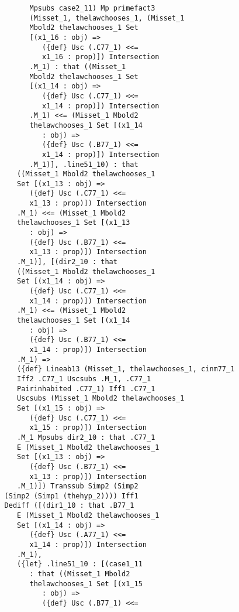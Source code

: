 \documentclass[12pt]{article}
\begin{document}
\begin{verbatim}
                Mpsubs case2_11) Mp primefact3 
                (Misset_1, thelawchooses_1, (Misset_1 
                Mbold2 thelawchooses_1 Set 
                [(x1_16 : obj) => 
                   ({def} Usc (.C77_1) <<= 
                   x1_16 : prop)]) Intersection 
                .M_1) : that ((Misset_1 
                Mbold2 thelawchooses_1 Set 
                [(x1_14 : obj) => 
                   ({def} Usc (.C77_1) <<= 
                   x1_14 : prop)]) Intersection 
                .M_1) <<= (Misset_1 Mbold2 
                thelawchooses_1 Set [(x1_14 
                   : obj) => 
                   ({def} Usc (.B77_1) <<= 
                   x1_14 : prop)]) Intersection 
                .M_1)], .line51_10) : that 
             ((Misset_1 Mbold2 thelawchooses_1 
             Set [(x1_13 : obj) => 
                ({def} Usc (.C77_1) <<= 
                x1_13 : prop)]) Intersection 
             .M_1) <<= (Misset_1 Mbold2 
             thelawchooses_1 Set [(x1_13 
                : obj) => 
                ({def} Usc (.B77_1) <<= 
                x1_13 : prop)]) Intersection 
             .M_1)], [(dir2_10 : that 
             ((Misset_1 Mbold2 thelawchooses_1 
             Set [(x1_14 : obj) => 
                ({def} Usc (.C77_1) <<= 
                x1_14 : prop)]) Intersection 
             .M_1) <<= (Misset_1 Mbold2 
             thelawchooses_1 Set [(x1_14 
                : obj) => 
                ({def} Usc (.B77_1) <<= 
                x1_14 : prop)]) Intersection 
             .M_1) => 
             ({def} Lineab13 (Misset_1, thelawchooses_1, cinm77_1 
             Iff2 .C77_1 Uscsubs .M_1, .C77_1 
             Pairinhabited .C77_1) Iff1 .C77_1 
             Uscsubs (Misset_1 Mbold2 thelawchooses_1 
             Set [(x1_15 : obj) => 
                ({def} Usc (.C77_1) <<= 
                x1_15 : prop)]) Intersection 
             .M_1 Mpsubs dir2_10 : that .C77_1 
             E (Misset_1 Mbold2 thelawchooses_1 
             Set [(x1_13 : obj) => 
                ({def} Usc (.B77_1) <<= 
                x1_13 : prop)]) Intersection 
             .M_1)]) Transsub Simp2 (Simp2 
          (Simp2 (Simp1 (thehyp_2)))) Iff1 
          Dediff ([(dir1_10 : that .B77_1 
             E (Misset_1 Mbold2 thelawchooses_1 
             Set [(x1_14 : obj) => 
                ({def} Usc (.A77_1) <<= 
                x1_14 : prop)]) Intersection 
             .M_1), 
             ({let} .line51_10 : [(case1_11 
                : that ((Misset_1 Mbold2 
                thelawchooses_1 Set [(x1_15 
                   : obj) => 
                   ({def} Usc (.B77_1) <<= 

\end{verbatim}
\end{document}
